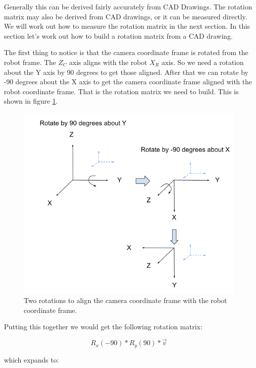\documentclass[11pt]{article}
\begin{document}
Generally this can be derived fairly accurately from CAD Drawings.  The rotation matrix may also
be derived from CAD drawings, or it can be measured directly.  We will work out how to 
measure the rotation matrix in the next section.  In this section let's work out how to 
build a rotation matrix from a CAD drawing.

The first thing to notice is that the camera coordinate frame is rotated from the robot
frame.  The $Z_C$ axis aligns with the robot $X_R$ axis.  So we need a rotation
about the Y axis by 90 degrees to get those aligned. After that we can rotate
by -90 degrees about the X axis to get the camera coordinate frame aligned with
the robot coordinate frame.  That is the rotation matrix we need to build.
This is shown in figure \ref{fig:rotations}.

\begin{figure}[h!]
    \centering
    \includegraphics[scale=0.5]{figures/rotations.png}
    \caption{Two rotations to align the camera coordinate frame with the robot coordinate frame.}
    \label{fig:rotations}
\end{figure}

Putting this together we would get the following rotation matrix:

\begin{equation}
    R_x(-90) * R_y(90) * \vec{v}
\end{equation}

which expands to:
\end{document}
